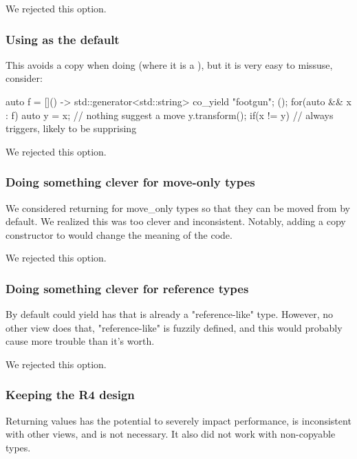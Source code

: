 \documentclass{wg21}
\begin{document}
We rejected this option.

\subsubsection{Using  as the default}

This avoids a copy when doing  (where it is a ),
but it is very easy to missuse, consider:

\begin{colorblock}
auto f = []() -> std::generator<std::string> { co_yield "footgun"; }();
for(auto && x : f) {
    auto y = x; // nothing suggest a move
    y.transform();
    if(x != y) {
        // always triggers, likely to be supprising
    }
}

\end{colorblock}
We rejected this option.


\subsubsection{Doing something clever for move-only types}

We considered returning  for move_only types so that they can be moved from by default.
We realized this was too clever and inconsistent.
Notably, adding a copy constructor to  would change the meaning of the code.

We rejected this option.

\subsubsection{Doing something clever for reference types}

By default  could yield  has that is already a "reference-like" type.
However, no other view does that, "reference-like" is fuzzily defined, and this would probably cause more trouble than it's worth.

We rejected this option.

\subsubsection{Keeping the R4 design}

Returning values has the potential to severely impact performance, is inconsistent with other views, and is not necessary.
It also did not work with non-copyable types.
\end{document}
